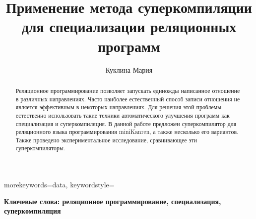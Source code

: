 
\title{Применение метода суперкомпиляции для специализации реляционных программ}

\author{Куклина Мария}


\maketitle


{
  morekeywords={data},
  keywordstyle=\bfseries\color{black}
}


\newcommand{\larrow}{\leftarrow}
\newcommand{\rarrow}{\rightarrow}

\newcommand{\embed}{\unlhd}
\newcommand{\instance}{\preccurlyeq}
\newcommand{\strictinst}{\prec}
\newcommand{\variant}{\approx}
\newcommand{\genup}{\lessdot}

\newcommand{\ukanren}{$\mu$Kanren }
\newcommand{\forcpd}{конъюнктивной частичной дедукции }
\newcommand{\cpd}{конъюнктивная частичная дедукция }
\newcommand{\Cpd}{Конъюнктивная частичная дедукция }

\newcommand{\origin}[1]{(англ. {\it #1})}

\newcommand{\relo}[1]{$\text{#1}^o$}


\graphicspath{{Kuklina/}}

\begin{abstract}
Реляционное программирование позволяет запускать единожды написанное отношение в различных направлениях.
Часто наиболее естественный способ записи отношения не является эффективным в некоторых направлениях.
Для решения этой проблемы естественно использовать такие техники автоматического улучшения программ как специализация и суперкомпиляция.
В данной работе предложен суперкомпилятор для реляционного языка программирования miniKanren, а также несколько его вариантов.
Также проведено экспериментальное исследование, сравнивающее эти суперкомпиляторы.
\end{abstract}
{\bf Ключевые слова: реляционное программирование, специализация, суперкомпиляция}










